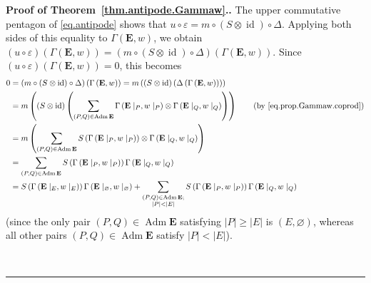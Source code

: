 \documentclass[numbers=enddot,12pt,final,onecolumn,notitlepage,abstracton]{scrartcl}%
\theoremstyle{definition}
\newenvironment{proof}[1][Proof]{\noindent\textbf{#1.} }{\ \rule{0.5em}{0.5em}}
\let\sumnonlimits\sum
\renewcommand{\sum}{\sumnonlimits\limits}
\newcommand{\id}{{\operatorname{id}}}
\newcommand{\Adm}{\operatorname{Adm}}
\newcommand{\EE}{{\mathbf{E}}}
\begin{document}
\begin{proof}[Proof of Theorem~\ref{thm.antipode.Gammaw}.]
The upper commutative pentagon of \eqref{eq.antipode} shows that
$u \circ \varepsilon = m \circ \left(S \otimes \id\right) \circ
\Delta$. Applying both sides of this equality to
$\Gamma\left(\EE, w\right)$, we obtain
$\left(u \circ \varepsilon\right)
\left(\Gamma\left(\EE, w\right)\right)
= \left(m \circ \left(S \otimes \id\right) \circ
\Delta\right) \left(\Gamma\left(\EE, w\right)\right)$.
Since
$\left(u \circ \varepsilon\right)
\left(\Gamma\left(\EE, w\right)\right) = 0$, this
becomes
\begin{align}
0
&= \left(m \circ \left(S \otimes \id\right) \circ
\Delta\right) \left(\Gamma\left(\EE, w\right)\right)
= m \left(\left(S \otimes \id\right) \left(
\Delta \left(\Gamma\left(\EE, w\right)\right)\right)\right)
\nonumber\\
&= m \left(\left(S \otimes \id\right) \left(
\sum_{\left(P, Q\right) \in \Adm \EE}
\Gamma\left(\EE\mid_P, w\mid_P\right)
\otimes \Gamma\left(\EE\mid_Q, w\mid_Q\right) \right) \right)
\qquad \left(\text{by \eqref{eq.prop.Gammaw.coprod}}\right)
\nonumber\\
&= m \left(\sum_{\left(P, Q\right) \in \Adm \EE}
S\left(\Gamma\left(\EE\mid_P, w\mid_P\right)\right)
\otimes
\Gamma\left(\EE\mid_Q, w\mid_Q\right)\right)
\nonumber\\
&= \sum_{\left(P, Q\right) \in \Adm \EE}
S\left(\Gamma\left(\EE\mid_P, w\mid_P\right)\right)
\Gamma\left(\EE\mid_Q, w\mid_Q\right)
\nonumber \\
&= S \left(\Gamma\left(\EE\mid_E, w\mid_E\right)\right)
\Gamma\left(\EE\mid_\varnothing, w\mid_\varnothing\right)
+ \sum_{\substack{\left(P, Q\right) \in \Adm \EE ; \\
                  \left|P\right| < \left|E\right|}}
S\left(\Gamma\left(\EE\mid_P, w\mid_P\right)\right)
\Gamma\left(\EE\mid_Q, w\mid_Q\right)
\label{pf.thm.antipode.Gammaw.Req.1}
\end{align}
(since the only pair $\left(P, Q\right) \in \Adm \EE$ satisfying
$\left|P\right| \geq \left|E\right|$ is $\left(E, \varnothing\right)$,
whereas all other pairs $\left(P, Q\right) \in \Adm \EE$
satisfy $\left|P\right| < \left|E\right|$).


\end{proof}
\end{document}
